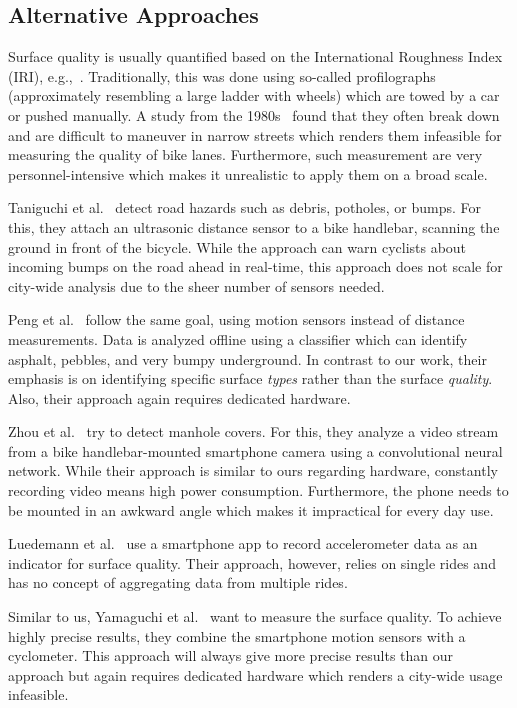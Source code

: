 \subsection{Alternative Approaches}
\label{subsec:related_work_cyclequality}
Surface quality is usually quantified based on the International Roughness Index (IRI), e.g.,~\cite{sayers1986The}.
Traditionally, this was done using so-called profilographs (approximately resembling a large ladder with wheels) which are towed by a car or pushed manually.
A study from the 1980s~\cite{cumbaa1986road} found that they often break down and are difficult to maneuver in narrow streets which renders them infeasible for measuring the quality of bike lanes.
Furthermore, such measurement are very personnel-intensive which makes it unrealistic to apply them on a broad scale.

Taniguchi et al.~\cite{taniguchi2015evaluation} detect road hazards such as debris, potholes, or bumps.
For this, they attach an ultrasonic distance sensor to a bike handlebar, scanning the ground in front of the bicycle.
While the approach can warn cyclists about incoming bumps on the road ahead in real-time, this approach does not scale for city-wide analysis due to the sheer number of sensors needed.

Peng et al.~\cite{peng2019road} follow the same goal, using motion sensors instead of distance measurements.
Data is analyzed offline using a classifier which can identify asphalt, pebbles, and very bumpy underground.
In contrast to our work, their emphasis is on identifying specific surface \textit{types} rather than the surface \textit{quality}.
Also, their approach again requires dedicated hardware.

Zhou et al.~\cite{zhou2022smartphone} try to detect manhole covers.
For this, they analyze a video stream from a bike handlebar-mounted smartphone camera using a convolutional neural network.
While their approach is similar to ours regarding hardware, constantly recording video means high power consumption.
Furthermore, the phone needs to be mounted in an awkward angle which makes it impractical for every day use.

Luedemann et al.~\cite{luedemann2022bikevibes} use a smartphone app to record accelerometer data as an indicator for surface quality.
Their approach, however, relies on single rides and has no concept of aggregating data from multiple rides.

Similar to us, Yamaguchi et al.~\cite{yamaguchi2015simple} want to measure the surface quality.
To achieve highly precise results, they combine the smartphone motion sensors with a cyclometer.
This approach will always give more precise results than our approach but again requires dedicated hardware which renders a city-wide usage infeasible.

